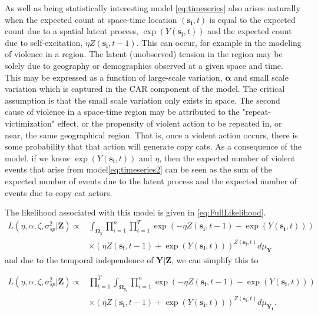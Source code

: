 \documentclass[11pt]{isuthesis}
\begin{document}
	As well as being statistically interesting model \eqref{eq:timeseries} also arises naturally when the expected count at space-time location $(\boldsymbol{s_i},t)$ is equal to the expected count due to a spatial latent process, $\exp(Y(\boldsymbol{s_i},t))$ and the expected count due to self-excitation, $\eta Z(\boldsymbol{s_i},t-1)$. This can occur, for example in the modeling of violence in a region.  The latent (unobserved) tension in the region may be solely due to geography or demographics observed at a given space and time.  This may be expressed as a function of large-scale variation, $\boldsymbol{\alpha}$ and small scale variation which is captured in the CAR component of the model.  The critical assumption is that the small scale variation only exists in space.  The second cause of violence in a space-time region may be attributed to the "repeat-victimization" effect, or the propensity of violent action to be repeated in, or near, the same geographical region.  That is, once a violent action occurs, there is some probability that that action will generate copy cats.  As a consequence of the model, if we know $\exp(Y(\boldsymbol{s_i},t))$ and $\eta$, then the expected number of violent events that arise from model\eqref{eq:timeseries2} can be seen as the sum of the expected number of events due to the latent process and the expected number of events due to copy cat actors.
	
	The likelihood associated with this model is given in \eqref{eq:FullLikelihood}.
	\begin{align}
	L(\eta,\alpha,\zeta,\sigma_{sp}^2|\boldsymbol{Z}) \propto & \int_{\boldsymbol{\Omega}_y} \prod_{i=1}^{n}\prod_{t=1}^{T} \exp(-\eta Z(\boldsymbol{s_i},t-1)-\exp(Y(\boldsymbol{s_i},t)))\nonumber\\
	&\times \left(\eta Z(\boldsymbol{s_i},t-1)+\exp(Y(\boldsymbol{s_i},t))\right)^{Z(\boldsymbol{s_i},t)} d\mu_{\boldsymbol{Y}}\label{eq:FullLikelihood}
	\end{align}
	and due to the temporal independence of $\boldsymbol{Y}|\boldsymbol{Z}$, we can simplify this to
	
	\begin{align}
	L(\eta,\alpha,\zeta,\sigma_{sp}^2|\boldsymbol{Z}) \propto & \prod_{t=1}^{T}\int_{\boldsymbol{\Omega}_{y_t}} \prod_{i=1}^{n} \exp(-\eta Z(\boldsymbol{s_i},t-1)-\exp(Y(\boldsymbol{s_i},t)))\nonumber\\
	&\times \left(\eta Z(\boldsymbol{s_i},t-1)+\exp(Y(\boldsymbol{s_i},t))\right)^{Z(\boldsymbol{s_i},t)} d\mu_{\boldsymbol{Y_t}}\label{eq:FullLikelihood2}.
	\end{align}
	
\end{document}
